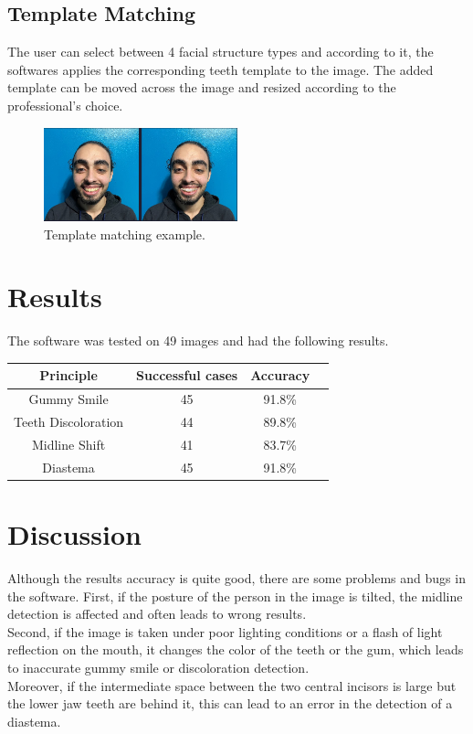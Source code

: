 \documentclass[conference,twocolumn]{IEEEtran}
\begin{document}
\subsection{Template Matching} 
The user can select between 4 facial structure types and according to it, the softwares applies the corresponding teeth template to the image.
The added template can be moved across the image and resized according to the professional's choice. 
\begin{figure}[H]
    \centering
    \includegraphics[width=0.5\textwidth]{template.png}
    \caption{Template matching example.}
    \label{fig:my_label}
\end{figure}
\section{\textbf{Results}}

The software was tested on 49 images and had the following results.
\begin{center}
\begin{tabular}{||c c c c||} 
 \hline
 Principle & Successful cases & Accuracy \\ [0.5ex] 
 \hline\hline
 Gummy Smile & 45 & 91.8\% \\[1ex] 
 \hline
 Teeth Discoloration & 44 & 89.8\% \\[1ex] 
 \hline
 Midline Shift & 41 & 83.7\% \\[1ex] 
 \hline
 Diastema & 45 & 91.8\% \\ [1ex] 
\hline
\end{tabular}
\end{center}
\section{\textbf{Discussion}}
Although the results accuracy is quite good, there are some problems and bugs in the software.
First, if the posture of the person in the image is tilted, the midline detection is affected and often leads to wrong results.\\
Second, if the image is taken under poor lighting conditions or a flash of light reflection on the mouth, it changes the color of the teeth or the gum, which leads to inaccurate gummy smile or discoloration detection.
\\Moreover, if the intermediate space between the two central incisors is large but the lower jaw teeth are behind it, this can lead to an error in the detection of a diastema.
\end{document}
